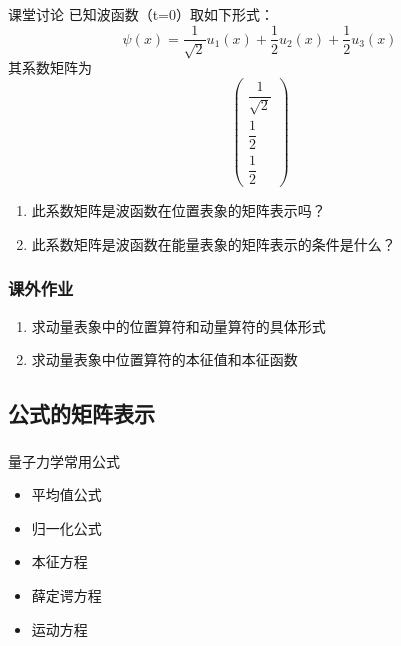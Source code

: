 \begin{frame} 
    \frametitle{}
    \begin{tcolorbox2}{课堂讨论}
    已知波函数（t=0）取如下形式：$$\psi(x)=\dfrac{1}{\sqrt{2}}u_1(x)+\dfrac{1}{2}u_2(x)+\dfrac{1}{2}u_3(x)$$
    其系数矩阵为$$\begin{pmatrix}
            \dfrac{1}{\sqrt{2}}\\
            \dfrac{1}{2}\\
            \dfrac{1}{2}
            \end{pmatrix}$$
    \begin{enumerate}
        \item  此系数矩阵是波函数在位置表象的矩阵表示吗？
        \item  此系数矩阵是波函数在能量表象的矩阵表示的条件是什么？  
    \end{enumerate}
    \end{tcolorbox2}
\end{frame} 

\begin{frame}
    \frametitle{课外作业}
    \begin{enumerate}
        \item 求动量表象中的位置算符和动量算符的具体形式
        \item 求动量表象中位置算符的本征值和本征函数
    \end{enumerate}
\end{frame}


\subsection{公式的矩阵表示}

\begin{frame}
\end{frame} 

\begin{frame} 
    \frametitle{}
    \begin{tcolorbox2}{量子力学常用公式}
        \begin{itemize}
            \item 平均值公式
            \item 归一化公式
            \item 本征方程
            \item 薛定谔方程
            \item 运动方程
        \end{itemize}   
    \end{tcolorbox2}
\end{frame} 

